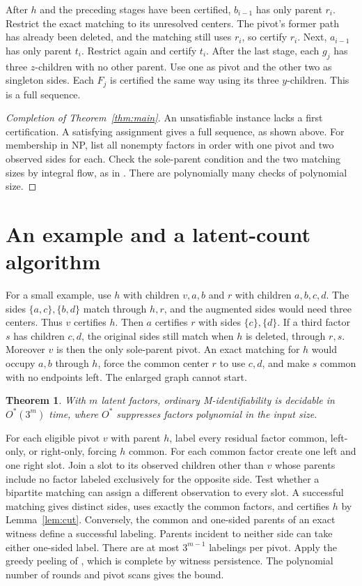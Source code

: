 \documentclass[11pt,a4paper]{amsart}
\newtheorem{theorem}{Theorem}
\begin{document}
After \(h\) and the preceding stages have been certified, \(b_{i-1}\) has only parent \(r_i\). Restrict the exact matching to its unresolved centers. The pivot's former path has already been deleted, and the matching still uses \(r_i\), so certify \(r_i\). Next, \(a_{i-1}\) has only parent \(t_i\). Restrict again and certify \(t_i\). After the last stage, each \(g_j\) has three \(z\)-children with no other parent. Use one as pivot and the other two as singleton sides. Each \(F_j\) is certified the same way using its three \(y\)-children. This is a full sequence.

\begin{proof}[Completion of Theorem~\ref{thm:main}]
An unsatisfiable instance lacks a first certification. A satisfying assignment gives a full sequence, as shown above. For membership in NP, list all nonempty factors in order with one pivot and two observed sides for each. Check the sole-parent condition and the two matching sizes by integral flow, as in \cite[Lemma~B.2]{preprint}. There are polynomially many checks of polynomial size.
\end{proof}

\section{An example and a latent-count algorithm}

For a small example, use \(h\) with children \(v,a,b\) and \(r\) with children \(a,b,c,d\). The sides \(\{a,c\},\{b,d\}\) match through \(h,r\), and the augmented sides would need three centers. Thus \(v\) certifies \(h\). Then \(a\) certifies \(r\) with sides \(\{c\},\{d\}\). If a third factor \(s\) has children \(c,d\), the original sides still match when \(h\) is deleted, through \(r,s\). Moreover \(v\) is then the only sole-parent pivot. An exact matching for \(h\) would occupy \(a,b\) through \(h\), force the common center \(r\) to use \(c,d\), and make \(s\) common with no endpoints left. The enlarged graph cannot start.

\begin{theorem}
With \(m\) latent factors, ordinary M-identifiability is decidable in \(O^*(3^m)\) time, where \(O^*\) suppresses factors polynomial in the input size.
\end{theorem}

For each eligible pivot \(v\) with parent \(h\), label every residual factor common, left-only, or right-only, forcing \(h\) common. For each common factor create one left and one right slot. Join a slot to its observed children other than \(v\) whose parents include no factor labeled exclusively for the opposite side. Test whether a bipartite matching can assign a different observation to every slot. A successful matching gives distinct sides, uses exactly the common factors, and certifies \(h\) by Lemma~\ref{lem:cut}. Conversely, the common and one-sided parents of an exact witness define a successful labeling. Parents incident to neither side can take either one-sided label. There are at most \(3^{m-1}\) labelings per pivot. Apply the greedy peeling of \cite[Algorithm~2]{preprint}, which is complete by witness persistence. The polynomial number of rounds and pivot scans gives the bound.
\end{document}
